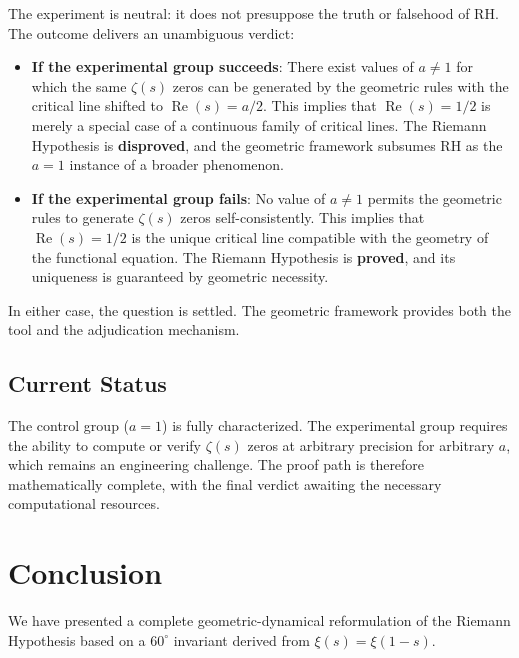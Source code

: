 \documentclass[12pt,a4paper]{article}
\begin{document}
The experiment is neutral: it does not presuppose the truth or falsehood of RH. The outcome delivers an unambiguous verdict:

\begin{itemize}
\item \textbf{If the experimental group succeeds}: There exist values of $a \neq 1$ for which the same $\zeta(s)$ zeros can be generated by the geometric rules with the critical line shifted to $\operatorname{Re}(s)=a/2$. This implies that $\operatorname{Re}(s)=1/2$ is merely a special case of a continuous family of critical lines. The Riemann Hypothesis is \textbf{disproved}, and the geometric framework subsumes RH as the $a=1$ instance of a broader phenomenon.

\item \textbf{If the experimental group fails}: No value of $a \neq 1$ permits the geometric rules to generate $\zeta(s)$ zeros self-consistently. This implies that $\operatorname{Re}(s)=1/2$ is the unique critical line compatible with the geometry of the functional equation. The Riemann Hypothesis is \textbf{proved}, and its uniqueness is guaranteed by geometric necessity.
\end{itemize}

In either case, the question is settled. The geometric framework provides both the tool and the adjudication mechanism.

\subsection{Current Status}

The control group ($a=1$) is fully characterized. The experimental group requires the ability to compute or verify $\zeta(s)$ zeros at arbitrary precision for arbitrary $a$, which remains an engineering challenge. The proof path is therefore mathematically complete, with the final verdict awaiting the necessary computational resources.

\section{Conclusion}

We have presented a complete geometric-dynamical reformulation of the Riemann Hypothesis based on a $60^\circ$ invariant derived from $\xi(s)=\xi(1-s)$.
\end{document}
